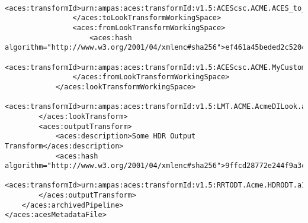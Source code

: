 \begin{lstlisting}
                    <aces:transformId>urn:ampas:aces:transformId:v1.5:ACEScsc.ACME.ACES_to_MyCustomLogSpace.a1.v1</aces:transformId>
                </aces:toLookTransformWorkingSpace>
                <aces:fromLookTransformWorkingSpace>
                    <aces:hash algorithm="http://www.w3.org/2001/04/xmlenc#sha256">ef461a45beded2c5204371f755ca2558e61743f288f3ccd719ce1de23ebcf9cb</aces:hash>
                    <aces:transformId>urn:ampas:aces:transformId:v1.5:ACEScsc.ACME.MyCustomLogSpace_to_ACES.a1.v1</aces:transformId>
                </aces:fromLookTransformWorkingSpace>
            </aces:lookTransformWorkingSpace>
            <aces:transformId>urn:ampas:aces:transformId:v1.5:LMT.ACME.AcmeDILook.a1.v5</aces:transformId>
        </aces:lookTransform>
        <aces:outputTransform>
            <aces:description>Some HDR Output Transform</aces:description>
            <aces:hash algorithm="http://www.w3.org/2001/04/xmlenc#sha256">9ffcd28772e244f9a3c6e9893f499f2b4f2f3313d292db51aeea4fd3f65f00d9</aces:hash>
            <aces:transformId>urn:ampas:aces:transformId:v1.5:RRTODT.Acme.HDRODT.a1.v3</aces:transformId>
        </aces:outputTransform>
    </aces:archivedPipeline>
</aces:acesMetadataFile>
\end{lstlisting}
